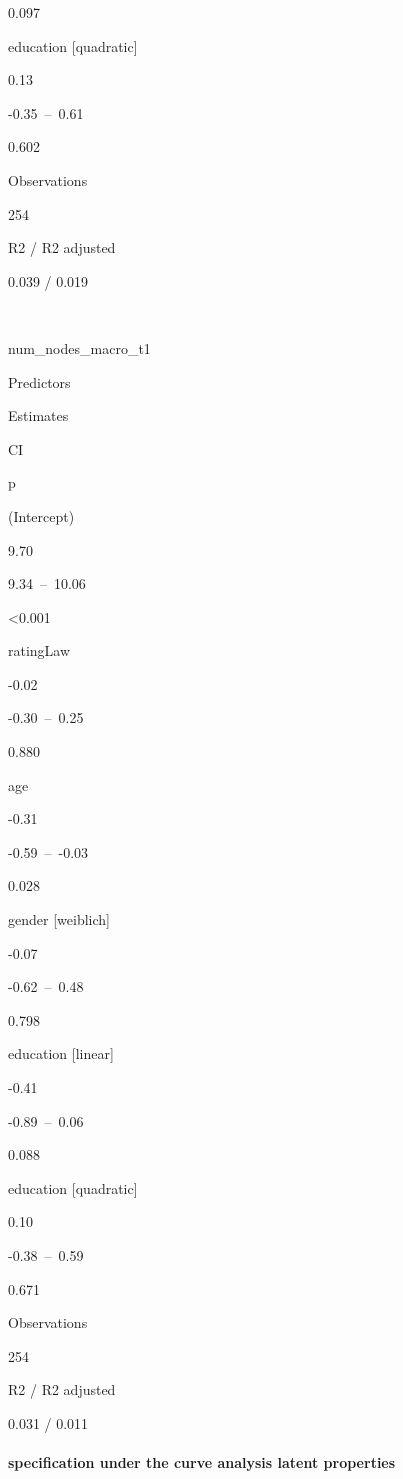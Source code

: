 \documentclass[
]{article}
\begin{document}
0.097

education {[}quadratic{]}

0.13

-0.35~--~0.61

0.602

Observations

254

R2 / R2 adjusted

0.039 / 0.019

~

num\_nodes\_macro\_t1

Predictors

Estimates

CI

p

(Intercept)

9.70

9.34~--~10.06

\textless0.001

ratingLaw

-0.02

-0.30~--~0.25

0.880

age

-0.31

-0.59~--~-0.03

0.028

gender {[}weiblich{]}

-0.07

-0.62~--~0.48

0.798

education {[}linear{]}

-0.41

-0.89~--~0.06

0.088

education {[}quadratic{]}

0.10

-0.38~--~0.59

0.671

Observations

254

R2 / R2 adjusted

0.031 / 0.011

\hypertarget{specification-under-the-curve-analysis-latent-properties}{%
\paragraph{specification under the curve analysis latent
properties}\label{specification-under-the-curve-analysis-latent-properties}}
\end{document}
